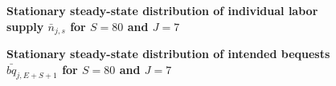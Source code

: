 \documentclass[letterpaper,12pt]{article}
\theoremstyle{definition}
\begin{document}
\begin{spacing}{1.5}
    \begin{figure}[htb]\centering \captionsetup{width=4.0in}
      \caption{\label{FigLabSS}\textbf{Stationary steady-state distribution of individual labor supply $\bar{n}_{j,s}$ for $S=80$ and $J=7$}}
    \end{figure}

    \begin{figure}[htb]\centering \captionsetup{width=4.0in}
      \caption{\label{FigBeqSS}\textbf{Stationary steady-state distribution of intended bequests $\bar{bq}_{j,E+S+1}$ for $S=80$ and $J=7$}}
    \end{figure}


\end{spacing}
\end{document}
